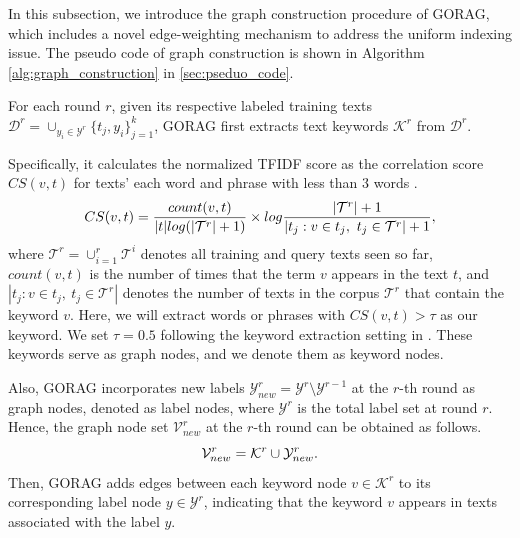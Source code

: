 In this subsection, we introduce the graph construction procedure of GORAG, which includes a novel edge-weighting mechanism to address the uniform indexing issue. 
The pseudo code of graph construction is shown in Algorithm \autoref{alg:graph_construction} in \autoref{sec:pseduo_code}.





For each round $r$,
given its respective labeled training texts $\mathcal{D}^r=\cup_{y_i \in \mathcal{Y}^r}\{t_j,y_i\}_{j=1}^k$, 
GORAG first extracts text keywords $\mathcal{K}^r$ from 
$\mathcal{D}^r$. 

Specifically, it
calculates the normalized TFIDF score \cite{tfidf} as the correlation score $CS(v,t)$ for texts' each word and phrase with less than 3 words \cite{wang2025agrag}. 
\vspace{-3px}
\begin{equation}\label{eq:tfidf_ke}
	\vspace{-4px}
	CS(v,t)=\frac{count(v,t)}{|t|log(|\mathcal{T}^r|+1)}\times log\frac{|\mathcal{T}^r|+1}{|t_j:v\in t_j, \ t_j \in \mathcal{T}^r|+1}, 
\end{equation}
where $ \mathcal{T}^r=\cup_{i=1}^r \mathcal{T}^i$ denotes all training and query texts seen so far, 
$count(v, t)$ is the number of times
that the term $v$ appears in the text $t$, 
and $|t_j : v \in t_j, \ t_j \in \mathcal{T}^r|$ denotes the number of texts in the corpus $\mathcal{T}^r$ that contain the keyword $v$. 
Here, we will extract words or phrases with $CS(v,t)>\tau$ as our keyword. 
We set $\tau=0.5$ following the keyword extraction setting in \cite{wang2025agrag}.
These keywords serve as graph nodes, and we denote them as keyword nodes.



Also, GORAG incorporates new labels $\mathcal{Y}^r_{new}=\mathcal{Y}^r\setminus\mathcal{Y}^{r-1}$ at the $r$-th round as graph nodes, denoted as label nodes, where $\mathcal{Y}^r$ is the total label set at round $r$. Hence, the graph node set $\mathcal{V}^r_{new}$ at the $r$-th round can be obtained as follows. 
\begin{equation}
	\vspace{-5px}
	\mathcal{V}_{new}^r=\mathcal{K}^r \cup\mathcal{Y}^r_{new}.
\end{equation}
Then, GORAG adds edges between each keyword node $v \in \mathcal{K}^r$ to its corresponding label node $y \in \mathcal{Y}^r$, indicating that the keyword $v$ appears in texts associated with the label $y$.




